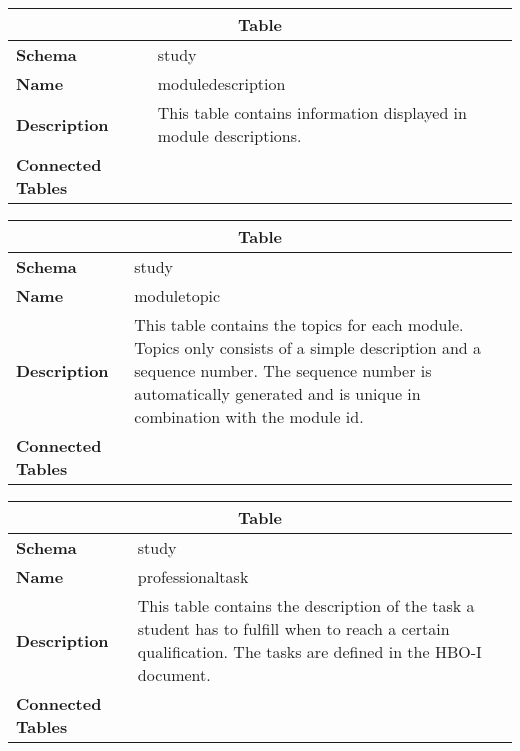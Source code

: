 \begin{table}[H]
	\label{table:moduledescription}
	\centering
	\begin{tabular}{|p{}|p{}|}
		\hline
		\multicolumn{2}{|c|}{\textbf{Table}} \\ \hline
		\textbf{Schema}               & study \\ \hline
		\textbf{Name}                 & moduledescription \\ \hline
		\textbf{Description}          & This table contains information displayed in module descriptions. \\ \hline
		\textbf{Connected Tables}     & \tableref{module} \\ \hline
	\end{tabular}
\end{table}

\begin{table}[H]
	\label{table:moduletopic}
	\centering
	\begin{tabular}{|p{}|p{}|}
		\hline
		\multicolumn{2}{|c|}{\textbf{Table}} \\ \hline
		\textbf{Schema}               & study \\ \hline
		\textbf{Name}                 & moduletopic \\ \hline
		\textbf{Description}          & This table contains the topics for each module. Topics only consists of a simple description and a sequence number. The sequence number is automatically generated and is unique in combination with the module id. \\ \hline
		\textbf{Connected Tables}     & \tableref{module} \\ \hline
	\end{tabular}
\end{table}

\begin{table}[H]
	\label{table:professionaltask}
	\centering
	\begin{tabular}{|p{}|p{}|}
		\hline
		\multicolumn{2}{|c|}{\textbf{Table}} \\ \hline
		\textbf{Schema}               & study \\ \hline
		\textbf{Name}                 & professionaltask \\ \hline
		\textbf{Description}          & This table contains the description of the task a student has to fulfill when to reach a certain qualification. The tasks are defined in the HBO-I document. \\ \hline
		\textbf{Connected Tables}     &  \tableref{qualification} \\ \hline
	\end{tabular}
\end{table}

